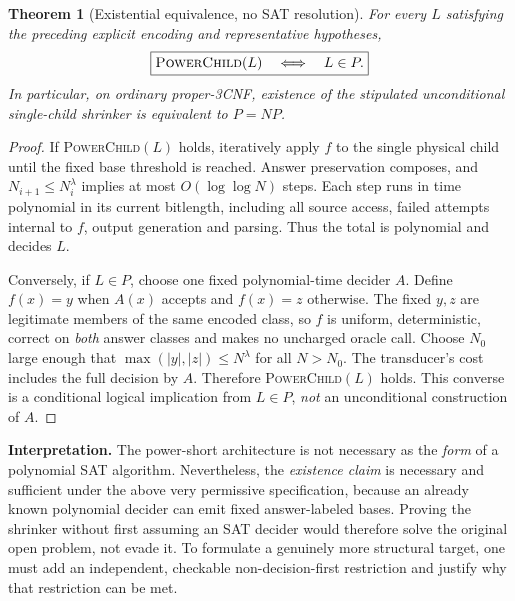 \documentclass[11pt]{article}
\newtheorem{theorem}{Theorem}
\begin{document}
\begin{theorem}[Existential equivalence, no SAT resolution]\label{thm:equiv}
For every $L$ satisfying the preceding explicit encoding and representative hypotheses,
\[
\boxed{\textsc{PowerChild}(L)\quad\Longleftrightarrow\quad L\in P.}
\]
In particular, on ordinary proper-3CNF, existence of the stipulated unconditional single-child shrinker is equivalent to $P=NP$.
\end{theorem}
\begin{proof}
If \textsc{PowerChild}$(L)$ holds, iteratively apply $f$ to the single physical child until the fixed base threshold is reached. Answer preservation composes, and $N_{i+1}\le N_i^\lambda$ implies at most $O(\log\log N)$ steps. Each step runs in time polynomial in its current bitlength, including all source access, failed attempts internal to $f$, output generation and parsing. Thus the total is polynomial and decides $L$.

Conversely, if $L\in P$, choose one fixed polynomial-time decider $A$. Define $f(x)=y$ when $A(x)$ accepts and $f(x)=z$ otherwise. The fixed $y,z$ are legitimate members of the same encoded class, so $f$ is uniform, deterministic, correct on \emph{both} answer classes and makes no uncharged oracle call. Choose $N_0$ large enough that $\max(|y|,|z|)\le N^\lambda$ for all $N>N_0$. The transducer's cost includes the full decision by $A$. Therefore \textsc{PowerChild}$(L)$ holds. This converse is a conditional logical implication from $L\in P$, \emph{not} an unconditional construction of $A$.
\end{proof}

\noindent\textbf{Interpretation.} The power-short architecture is not necessary as the \emph{form} of a polynomial SAT algorithm. Nevertheless, the \emph{existence claim} is necessary and sufficient under the above very permissive specification, because an already known polynomial decider can emit fixed answer-labeled bases. Proving the shrinker without first assuming an SAT decider would therefore solve the original open problem, not evade it. To formulate a genuinely more structural target, one must add an independent, checkable non-decision-first restriction and justify why that restriction can be met.
\end{document}
